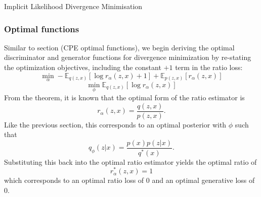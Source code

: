\documentclass[a4paper,12pt]{article}
\numberwithin{equation}{section}
\begin{document}
\begin{algorithm}
\caption{Implicit Likelihood Divergence Minimisation}
\BlankLine
{}
\end{algorithm}
\newpage
\subsubsection{Optimal functions}
Similar to section (CPE optimal functions), we begin deriving the optimal discriminator and generator functions for divergence minimization by re-stating the optimization objectives, including the constant $+1$ term in the ratio loss:
\[\min_\alpha-\mathbb{E}_{q(z,x)}[\log r_\alpha(z,x)+1]+\mathbb{E}_{p(z,x)}[r_\alpha(z,x)]\]
\[\min_\phi \mathbb{E}_{q(z,x)}[\log r_\alpha (z,x)]\]
From the theorem, it is known that the optimal form of the ratio estimator is
\[r_\alpha(z,x)=\frac{q(z,x)}{p(z,x)}.\]
Like the previous section, this corresponds to an optimal posterior with $\phi$ such that
\[q_\phi(z|x)=\frac{p(x)p(z|x)}{q^*(x)}.\]
Substituting this back into the optimal ratio estimator yields the optimal ratio of
\[r_\alpha^*(z,x)=1\]
which corresponds to an optimal ratio loss of $0$ and an optimal generative loss of $0$.
\end{document}
